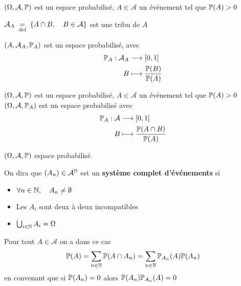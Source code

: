 \begin{defprop}[Trace]
    \Hyp $(\Omega, \mathcal A, \P)$ est un espace probabilisé, $A\in \mathcal A$ un événement tel que $\P(A)>0$
    \begin{concenum}
        \item $\mathcal A_A\defeq\{A\cap B, \quad B\in \mathcal A\}$ est une tribu de $A$
        \item $(A,\mathcal A_A, \P_A)$ est un espace probabilisé, avec {\begin{align*}
                \P_A:\mathcal A_A  &\longrightarrow [0,1] \\
                B &\longmapsto \frac{\P(B)}{\P(A)}
        \end{align*}}
    \end{concenum}
\end{defprop}

\begin{prop}
    \Hyp $(\Omega, \mathcal A, \P)$ est un espace probabilisé, $A\in \mathcal A$ un événement tel que $\P(A)>0$
    \Conc $(\Omega, \mathcal A, \P_A)$ est un espace probabilisé avec { \begin{align*}
            \P_A: \mathcal A &\longrightarrow [0,1] \\
            B &\longmapsto \frac{\P(A\cap B)}{\P(A)}
    \end{align*} }
\end{prop}

\begin{thmdef}
    \Hyp $(\Omega, \mathcal A, \P)$ espace probabilisé
    \begin{concenum}
    \item On dira que $(A_n)\in \mathcal A^{\N}$ est un \textbf{système complet d'événements} si \begin{itemize}
        \item $ \forall n\in \N,\quad A_n \neq \emptyset$
        \item Les $A_i$ sont deux à deux incompatibles
        \item $\bigcup_{i \in  \N}A_i  =\Omega$ 
    \end{itemize}
    \item Pour tout $A\in \mathcal A$ on a dans ce cas \[
            \P(A)=\sum_{n \in  \N} \P(A\cap A_n)=\sum_{n \in  \N} \P_{A_n}(A)\P(A_n)
    \] 
    en convenant que si $\P(A_n)=0$ alors $\P(A_n)\P_{A_n}(A)=0$
    \end{concenum}
\end{thmdef}


